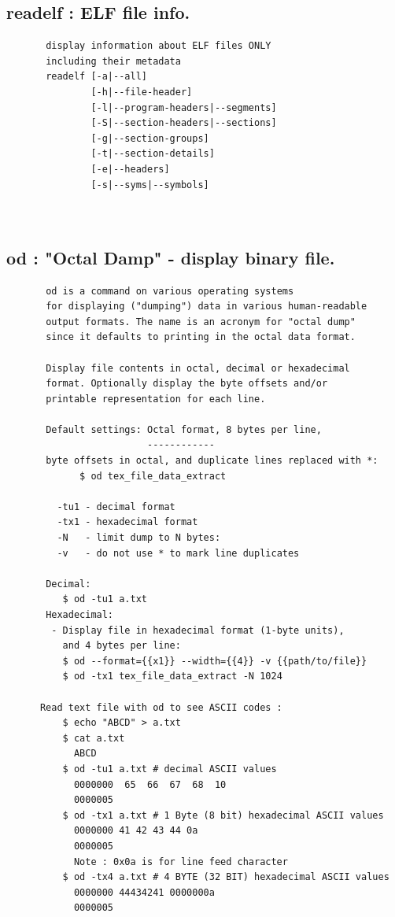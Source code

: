\documentclass[a4paper,12pt]{article}
\begin{document}
\subsection{readelf  : ELF file info.}
\begin{verbatim}
       display information about ELF files ONLY
       including their metadata
       readelf [-a|--all]
               [-h|--file-header]
               [-l|--program-headers|--segments]
               [-S|--section-headers|--sections]
               [-g|--section-groups]
               [-t|--section-details]
               [-e|--headers]
               [-s|--syms|--symbols]

       
\end{verbatim}


\subsection{od  : "Octal Damp" - display binary file.}
\begin{verbatim}
       od is a command on various operating systems 
       for displaying ("dumping") data in various human-readable 
       output formats. The name is an acronym for "octal dump" 
       since it defaults to printing in the octal data format.

       Display file contents in octal, decimal or hexadecimal          
       format. Optionally display the byte offsets and/or  
       printable representation for each line.

       Default settings: Octal format, 8 bytes per line, 
                         ------------
       byte offsets in octal, and duplicate lines replaced with *:
             $ od tex_file_data_extract 
       
         -tu1 - decimal format
         -tx1 - hexadecimal format
         -N   - limit dump to N bytes:
         -v   - do not use * to mark line duplicates
            
       Decimal:
          $ od -tu1 a.txt
       Hexadecimal: 
        - Display file in hexadecimal format (1-byte units), 
          and 4 bytes per line:
          $ od --format={{x1}} --width={{4}} -v {{path/to/file}}
          $ od -tx1 tex_file_data_extract -N 1024          
      
      Read text file with od to see ASCII codes : 
          $ echo "ABCD" > a.txt
          $ cat a.txt
            ABCD
          $ od -tu1 a.txt # decimal ASCII values
            0000000  65  66  67  68  10
            0000005
          $ od -tx1 a.txt # 1 Byte (8 bit) hexadecimal ASCII values
            0000000 41 42 43 44 0a
            0000005 
            Note : 0x0a is for line feed character 
          $ od -tx4 a.txt # 4 BYTE (32 BIT) hexadecimal ASCII values
            0000000 44434241 0000000a
            0000005

\end{verbatim}
\end{document}

